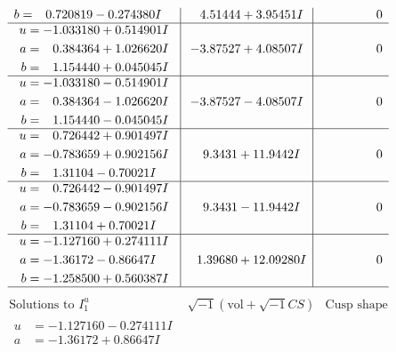 \documentclass[1p]{elsarticle_modified}
\theoremstyle{definition}
\newcommand{\I}{\sqrt{-1}}
\begin{document}
$$\begin{array}{c|c|c}
\begin{aligned}
b &= \phantom{-}0.720819 - 0.274380 I\end{aligned}
 & \phantom{-}4.51444 + 3.95451 I & \phantom{-0.000000 } 0 \\ \hline\begin{aligned}
u &= -1.033180 + 0.514901 I \\
a &= \phantom{-}0.384364 + 1.026620 I \\
b &= \phantom{-}1.154440 + 0.045045 I\end{aligned}
 & -3.87527 + 4.08507 I & \phantom{-0.000000 } 0 \\ \hline\begin{aligned}
u &= -1.033180 - 0.514901 I \\
a &= \phantom{-}0.384364 - 1.026620 I \\
b &= \phantom{-}1.154440 - 0.045045 I\end{aligned}
 & -3.87527 - 4.08507 I & \phantom{-0.000000 } 0 \\ \hline\begin{aligned}
u &= \phantom{-}0.726442 + 0.901497 I \\
a &= -0.783659 + 0.902156 I \\
b &= \phantom{-}1.31104 - 0.70021 I\end{aligned}
 & \phantom{-}9.3431 + 11.9442 I & \phantom{-0.000000 } 0 \\ \hline\begin{aligned}
u &= \phantom{-}0.726442 - 0.901497 I \\
a &= -0.783659 - 0.902156 I \\
b &= \phantom{-}1.31104 + 0.70021 I\end{aligned}
 & \phantom{-}9.3431 - 11.9442 I & \phantom{-0.000000 } 0 \\ \hline\begin{aligned}
u &= -1.127160 + 0.274111 I \\
a &= -1.36172 - 0.86647 I \\
b &= -1.258500 + 0.560387 I\end{aligned}
 & \phantom{-}1.39680 + 12.09280 I & \phantom{-0.000000 } 0\\
 \hline 
 \end{array}$$\newpage$$\begin{array}{c|c|c}  
\text{Solutions to }I^u_{1}& \I (\text{vol} + \sqrt{-1}CS) & \text{Cusp shape}\\
 \hline 
\begin{aligned}
u &= -1.127160 - 0.274111 I \\
a &= -1.36172 + 0.86647 I \\

\end{aligned}
\end{array}$$
\end{document}

